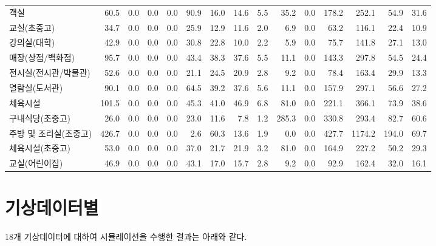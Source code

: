 \begin{defaulttable}
\begin{tabular}{lrrrrrrrrrrrrrr}
객실 & 60.5 & 0.0 & 0.0 & 0.0 & 90.9 & 16.0 & 14.6 & 5.5 & 35.2 & 0.0 & 178.2 & 252.1 & 54.9 & 31.6 \\
교실(초중고) & 34.7 & 0.0 & 0.0 & 0.0 & 25.9 & 12.9 & 11.6 & 2.0 & 6.9 & 0.0 & 63.2 & 116.1 & 22.4 & 10.9 \\
강의실(대학) & 42.9 & 0.0 & 0.0 & 0.0 & 30.8 & 22.8 & 10.0 & 2.2 & 5.9 & 0.0 & 75.7 & 141.8 & 27.1 & 13.0 \\
매장(상점/백화점) & 95.7 & 0.0 & 0.0 & 0.0 & 43.4 & 38.3 & 37.6 & 5.5 & 11.1 & 0.0 & 143.3 & 297.8 & 54.5 & 24.4 \\
전시실(전시관/박물관) & 52.6 & 0.0 & 0.0 & 0.0 & 21.1 & 24.5 & 20.9 & 2.8 & 9.2 & 0.0 & 78.4 & 163.4 & 29.9 & 13.3 \\
열람실(도서관) & 90.1 & 0.0 & 0.0 & 0.0 & 64.5 & 39.2 & 37.6 & 5.6 & 11.1 & 0.0 & 157.9 & 297.1 & 56.6 & 27.2 \\
체육시설 & 101.5 & 0.0 & 0.0 & 0.0 & 45.3 & 41.0 & 46.9 & 6.8 & 81.0 & 0.0 & 221.1 & 366.1 & 73.9 & 38.6 \\
구내식당(초중고) & 26.0 & 0.0 & 0.0 & 0.0 & 23.0 & 11.6 & 7.8 & 1.2 & 285.3 & 0.0 & 330.8 & 293.4 & 82.7 & 60.6 \\
주방 및 조리실(초중고) & 426.7 & 0.0 & 0.0 & 0.0 & 2.6 & 60.3 & 13.6 & 1.9 & 0.0 & 0.0 & 427.7 & 1174.2 & 194.0 & 69.7 \\
체육시설(초중고) & 53.0 & 0.0 & 0.0 & 0.0 & 37.0 & 21.7 & 21.9 & 3.2 & 81.0 & 0.0 & 164.9 & 227.2 & 50.2 & 29.3 \\
교실(어린이집) & 46.9 & 0.0 & 0.0 & 0.0 & 43.1 & 17.0 & 15.7 & 2.8 & 9.2 & 0.0 & 92.9 & 162.4 & 32.0 & 16.1 \\
\bottomrule
\end{tabular}

\end{defaulttable}


\section{기상데이터별}
18개 기상데이터에 대하여 시뮬레이션을 수행한 결과는 아래와 같다. 

